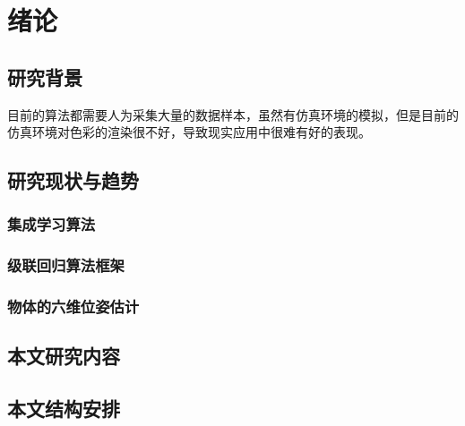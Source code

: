 \chapter{绪论}

\section{研究背景}

目前的算法都需要人为采集大量的数据样本，虽然有仿真环境的模拟，但是目前的仿真环境对色彩的渲染很不好，导致现实应用中很难有好的表现。

\section{研究现状与趋势}
\subsection{集成学习算法} %
\subsection{级联回归算法框架} %
\subsection{物体的六维位姿估计}

\section{本文研究内容}

\section{本文结构安排}
